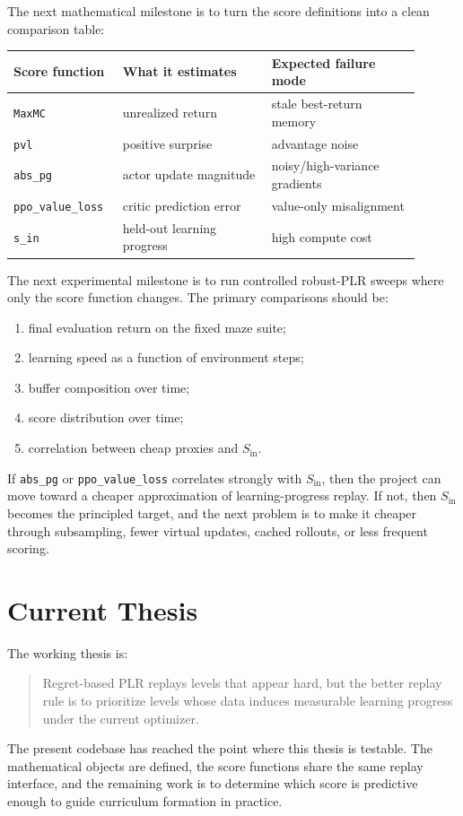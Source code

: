 \documentclass[11pt]{article}
\begin{document}
The next mathematical milestone is to turn the score definitions into a clean
comparison table:
\begin{center}
\begin{tabular}{@{}p{0.22\linewidth}p{0.34\linewidth}p{0.34\linewidth}@{}}
\toprule
Score function & What it estimates & Expected failure mode \\
\midrule
\texttt{MaxMC} & unrealized return & stale best-return memory \\
\texttt{pvl} & positive surprise & advantage noise \\
\texttt{abs\_pg} & actor update magnitude & noisy/high-variance gradients \\
\texttt{ppo\_value\_loss} & critic prediction error & value-only misalignment \\
\texttt{s\_in} & held-out learning progress & high compute cost \\
\bottomrule
\end{tabular}
\end{center}

The next experimental milestone is to run controlled robust-PLR sweeps where
only the score function changes. The primary comparisons should be:
\begin{enumerate}[leftmargin=*]
  \item final evaluation return on the fixed maze suite;
  \item learning speed as a function of environment steps;
  \item buffer composition over time;
  \item score distribution over time;
  \item correlation between cheap proxies and $S_{\mathrm{in}}$.
\end{enumerate}

If \texttt{abs\_pg} or \texttt{ppo\_value\_loss} correlates strongly with $S_{\mathrm{in}}$, then the
project can move toward a cheaper approximation of learning-progress replay.
If not, then $S_{\mathrm{in}}$ becomes the principled target, and the next problem is to
make it cheaper through subsampling, fewer virtual updates, cached rollouts, or
less frequent scoring.

\section{Current Thesis}

The working thesis is:
\begin{quote}
Regret-based PLR replays levels that appear hard, but the better replay rule
is to prioritize levels whose data induces measurable learning progress under
the current optimizer.
\end{quote}

The present codebase has reached the point where this thesis is testable. The
mathematical objects are defined, the score functions share the same replay
interface, and the remaining work is to determine which score is predictive
enough to guide curriculum formation in practice.
\end{document}
